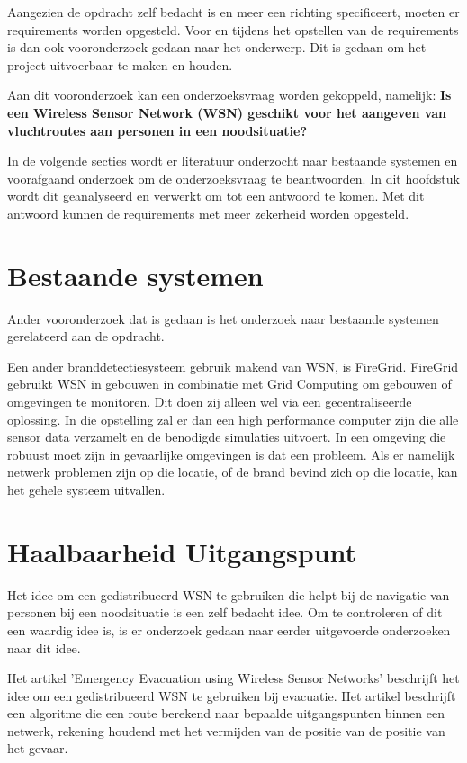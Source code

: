 
Aangezien de opdracht zelf bedacht is en meer een richting specificeert, moeten er requirements worden opgesteld. Voor en tijdens het opstellen van de requirements is dan ook vooronderzoek gedaan naar het onderwerp. Dit is gedaan om het project uitvoerbaar te maken en houden.

Aan dit vooronderzoek kan een onderzoeksvraag worden gekoppeld, namelijk: 
\textbf{Is een Wireless Sensor Network (WSN) geschikt voor het aangeven van vluchtroutes aan personen in een noodsituatie?}

In de volgende secties wordt er literatuur onderzocht naar bestaande systemen en voorafgaand onderzoek om de onderzoeksvraag te beantwoorden. In dit hoofdstuk wordt dit geanalyseerd en verwerkt om tot een antwoord te komen. Met dit antwoord kunnen de requirements met meer zekerheid worden opgesteld.

\section{Bestaande systemen}
Ander vooronderzoek dat is gedaan is het onderzoek naar bestaande systemen gerelateerd aan de opdracht. 

Een ander branddetectiesysteem gebruik makend van WSN, is FireGrid\cite{FireGrid}. FireGrid gebruikt WSN in gebouwen in combinatie met Grid Computing om gebouwen of omgevingen te monitoren. Dit doen zij alleen wel via een gecentraliseerde oplossing. In die opstelling zal er dan een high performance computer zijn die alle sensor data verzamelt en de benodigde simulaties uitvoert. In een omgeving die robuust moet zijn in gevaarlijke omgevingen is dat een probleem. Als er namelijk netwerk problemen zijn op die locatie, of de brand bevind zich op die locatie, kan het gehele systeem uitvallen. 


\section{Haalbaarheid Uitgangspunt}
Het idee om een gedistribueerd WSN te gebruiken die helpt bij de navigatie van personen bij een noodsituatie is een zelf bedacht idee. Om te controleren of dit een waardig idee is, is er onderzoek gedaan naar eerder uitgevoerde onderzoeken naar dit idee.

Het artikel 'Emergency Evacuation using Wireless Sensor Networks'\cite{BarnesEmEv} beschrijft het idee om een gedistribueerd WSN te gebruiken bij evacuatie. Het artikel beschrijft een algoritme die een route berekend naar bepaalde uitgangspunten binnen een netwerk, rekening houdend met het vermijden van de positie van de positie van het gevaar.


